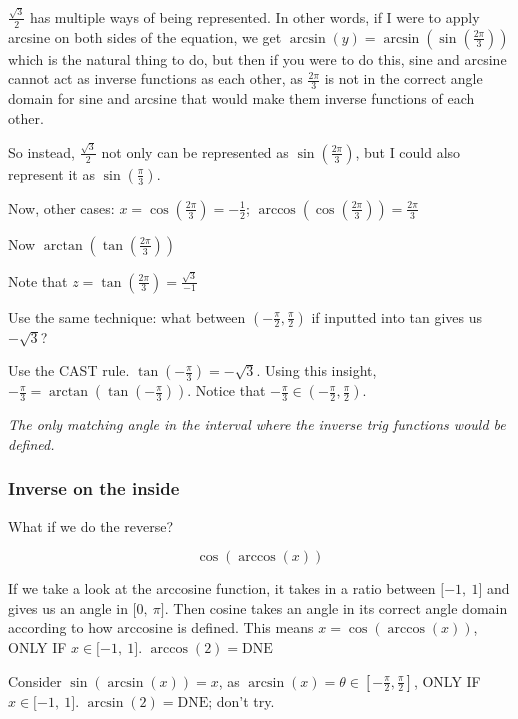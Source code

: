 \documentclass[
]{article}
\begin{document}
$\frac{\sqrt{3}}{2}$ has multiple ways of being represented. In other
words, if I were to apply arcsine on both sides of the equation, we get
$\arcsin(y) = \arcsin\left( \sin\left( \frac{2\pi}{3} \right) \right)$
which is the natural thing to do, but then if you were to do this, sine
and arcsine cannot act as inverse functions as each other, as
$\frac{2\pi}{3}$ is not in the correct angle domain for sine and
arcsine that would make them inverse functions of each other.

So instead, $\frac{\sqrt{3}}{2}$ not only can be represented as
$\sin\left( \frac{2\pi}{3} \right)$, but I could also represent it as
$\sin\left( \frac{\pi}{3} \right)$.

Now, other cases:
$x = \cos\left( \frac{2\pi}{3} \right) = - \frac{1}{2}$;
$\arccos\left( \cos\left( \frac{2\pi}{3} \right) \right) = \frac{2\pi}{3}$

Now $\arctan\left( \tan\left( \frac{2\pi}{3} \right) \right)$

Note that
$z = \tan\left( \frac{2\pi}{3} \right) = \frac{\sqrt{3}}{- 1}$

Use the same technique: what between
$( - \frac{\pi}{2},\frac{\pi}{2})$ if inputted into tan gives us
$- \sqrt{3}$?

Use the CAST rule. $\tan\left( - \frac{\pi}{3} \right) = - \sqrt{3}$.
Using this insight,
$- \frac{\pi}{3} = \arctan\left( \tan\left( - \frac{\pi}{3} \right) \right)$.
Notice that
$- \frac{\pi}{3} \in \left( - \frac{\pi}{2},\frac{\pi}{2} \right)$.

\emph{The only matching angle in the interval where the inverse trig
functions would be defined.}


\subsubsection{\texorpdfstring{ Inverse on the
inside}{ Inverse on the inside}}

What if we do the reverse?

$$\cos\left( \arccos(x) \right)$$

If we take a look at the arccosine function, it takes in a ratio between
$\lbrack - 1,\ 1\rbrack$ and gives us an angle in
$\lbrack 0,\ \pi\rbrack$. Then cosine takes an angle in its correct
angle domain according to how arccosine is defined. This means
$x = \cos\left( \arccos(x) \right)$, ONLY IF
$x \in \lbrack - 1,\ 1\rbrack$. $\arccos(2) = \text{DNE}$

Consider $\sin\left( \arcsin(x) \right) = x$, as
$\arcsin(x) = \theta \in \left\lbrack - \frac{\pi}{2},\frac{\pi}{2} \right\rbrack$,
ONLY IF $x \in \lbrack - 1,\ 1\rbrack$. $\arcsin(2) = \text{DNE}$;
don't try.
\end{document}
